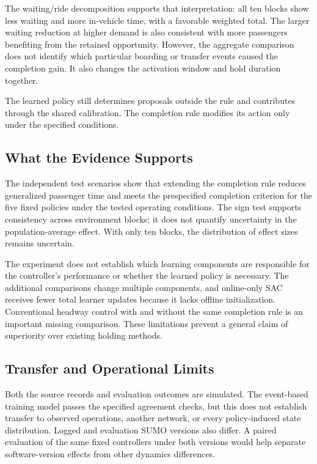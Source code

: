 \documentclass[letterpaper,journal]{IEEEtran}
\begin{document}
The waiting/ride decomposition supports that interpretation: all ten blocks show less waiting and more in-vehicle time, with a favorable weighted total. The larger waiting reduction at higher demand is also consistent with more passengers benefiting from the retained opportunity. However, the aggregate comparison does not identify which particular boarding or transfer events caused the completion gain. It also changes the activation window and hold duration together.

The learned policy still determines proposals outside the rule and contributes through the shared calibration. The completion rule modifies its action only under the specified conditions.

\subsection{What the Evidence Supports}
The independent test scenarios show that extending the completion rule reduces generalized passenger time and meets the prespecified completion criterion for the five fixed policies under the tested operating conditions. The sign test supports consistency across environment blocks; it does not quantify uncertainty in the population-average effect. With only ten blocks, the distribution of effect sizes remains uncertain.

The experiment does not establish which learning components are responsible for the controller's performance or whether the learned policy is necessary. The additional comparisons change multiple components, and online-only SAC receives fewer total learner updates because it lacks offline initialization. Conventional headway control with and without the same completion rule is an important missing comparison. These limitations prevent a general claim of superiority over existing holding methods.

\subsection{Transfer and Operational Limits}
Both the source records and evaluation outcomes are simulated. The event-based training model passes the specified agreement checks, but this does not establish transfer to observed operations, another network, or every policy-induced state distribution. Logged and evaluation SUMO versions also differ. A paired evaluation of the same fixed controllers under both versions would help separate software-version effects from other dynamics differences.
\end{document}
